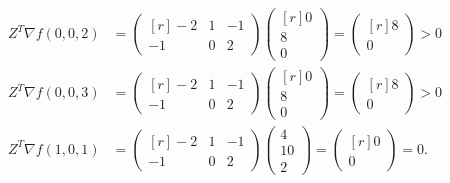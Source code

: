 \begin{solution}
    \begin{align*}
        Z^T \nabla f(0, 0, 2) &= \begin{pmatrix*}[r]
            -2 &  1 & -1 \\
            -1 &  0 &  2
        \end{pmatrix*} \begin{pmatrix*}[r]
            0 \\
            8 \\
            0
        \end{pmatrix*} = \begin{pmatrix*}[r]
            8 \\
            0
        \end{pmatrix*} > 0 \\
        Z^T \nabla f(0, 0, 3) &= \begin{pmatrix*}[r]
            -2 &  1 & -1 \\
            -1 &  0 &  2
        \end{pmatrix*} \begin{pmatrix*}[r]
            0 \\
            8 \\
            0
        \end{pmatrix*} = \begin{pmatrix*}[r]
            8 \\
            0
        \end{pmatrix*} > 0 \\
        Z^T \nabla f(1, 0, 1) &= \begin{pmatrix*}[r]
            -2 &  1 & -1 \\
            -1 &  0 &  2
        \end{pmatrix*} \begin{pmatrix*}
            4  \\
            10 \\
            2   
        \end{pmatrix*} = \begin{pmatrix*}[r]
            0 \\
            0
        \end{pmatrix*} = 0.
    \end{align*}
    \ \\
\end{solution}